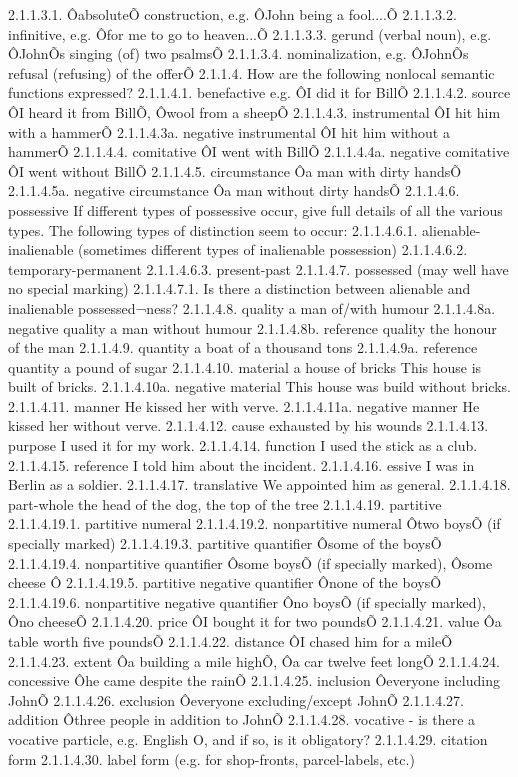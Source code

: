 2.1.1.3.1. ÔabsoluteÕ construction, e.g. ÔJohn being a fool....Õ
2.1.1.3.2. infinitive, e.g. Ôfor me to go to heaven...Õ
2.1.1.3.3. gerund (verbal noun), e.g. ÔJohnÕs singing (of) two psalmsÕ
2.1.1.3.4. nominalization, e.g. ÔJohnÕs refusal (refusing) of the offerÕ
2.1.1.4. How are the following nonlocal semantic functions expressed?
2.1.1.4.1. benefactive e.g. ÔI did it for BillÕ
2.1.1.4.2. source ÔI heard it from BillÕ, Ôwool from a sheepÕ
2.1.1.4.3. instrumental ÔI hit him with a hammerÕ
2.1.1.4.3a. negative instrumental ÔI hit him without a hammerÕ
2.1.1.4.4. comitative ÔI went with BillÕ
2.1.1.4.4a. negative comitative ÔI went without BillÕ
2.1.1.4.5. circumstance Ôa man with dirty handsÕ
2.1.1.4.5a. negative circumstance Ôa man without dirty handsÕ
2.1.1.4.6. possessive
If different types of possessive occur, give full details of all the various types. The following types of distinction seem to occur:
2.1.1.4.6.1. alienable-inalienable (sometimes different types of inalienable possession)
2.1.1.4.6.2. temporary-permanent
2.1.1.4.6.3. present-past
2.1.1.4.7. possessed (may well have no special marking)
2.1.1.4.7.1. Is there a distinction between alienable and inalienable possessed¬ness?
2.1.1.4.8. quality
a man of/with humour
2.1.1.4.8a. negative quality
a man without humour
2.1.1.4.8b. reference quality
the honour of the man
2.1.1.4.9. quantity
a boat of a thousand tons
2.1.1.4.9a. reference quantity
a pound of sugar
2.1.1.4.10. material
a house of bricks
This house is built of bricks.
2.1.1.4.10a. negative material
This house was build without bricks.
2.1.1.4.11. manner
He kissed her with verve.
2.1.1.4.11a. negative manner
He kissed her without verve.
2.1.1.4.12. cause
exhausted by his wounds
2.1.1.4.13. purpose
I used it for my work.
2.1.1.4.14. function
I used the stick as a club.
2.1.1.4.15. reference
I told him about the incident.
2.1.1.4.16. essive
I was in Berlin as a soldier.
2.1.1.4.17. translative
We appointed him as general.
2.1.1.4.18. part-whole
the head of the dog, the top of the tree
2.1.1.4.19. partitive
2.1.1.4.19.1. partitive numeral
2.1.1.4.19.2. nonpartitive numeral Ôtwo boysÕ (if specially marked)
2.1.1.4.19.3. partitive quantifier Ôsome of the boysÕ
2.1.1.4.19.4. nonpartitive quantifier Ôsome boysÕ (if specially marked), Ôsome cheese Ô
2.1.1.4.19.5. partitive negative quantifier Ônone of the boysÕ
2.1.1.4.19.6. nonpartitive negative quantifier Ôno boysÕ (if specially marked), Ôno cheeseÕ
2.1.1.4.20. price ÔI bought it for two poundsÕ
2.1.1.4.21. value Ôa table worth five poundsÕ
2.1.1.4.22. distance ÔI chased him for a mileÕ
2.1.1.4.23. extent Ôa building a mile highÕ, Ôa car twelve feet longÕ
2.1.1.4.24. concessive Ôhe came despite the rainÕ
2.1.1.4.25. inclusion Ôeveryone including JohnÕ
2.1.1.4.26. exclusion Ôeveryone excluding/except JohnÕ
2.1.1.4.27. addition Ôthree people in addition to JohnÕ
2.1.1.4.28. vocative - is there a vocative particle, e.g. English O, and if so, is it obligatory?
2.1.1.4.29. citation form
2.1.1.4.30. label form (e.g. for shop-fronts, parcel-labels, etc.)



